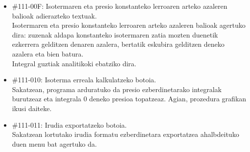 \documentclass[10pt,a4paper]{article}
\let\nf\normalfont %
\newcommand{\cf}{\normalfont\sffamily}
\begin{document}
\begin{itemize}
\item \cf \#111-00F: Isotermaren eta presio konstanteko lerroaren arteko azaleren balioak adierazteko textuak.
\\
\nf Isotermaren eta presio konstanteko lerroaren arteko azaleren balioak agertuko dira: zuzenak aldapa konstanteko isotermaren zatia mozten duenetik ezkerrera gelditzen denaren azalera, bertatik eskubira gelditzen deneko azalera eta bien batura.
\\

Integral guztiak analitikoki ebatziko dira.
\\

\item \cf \#111-010: Isoterma erreala kalkulatzeko botoia.
\\
\nf Sakatzean, programa arduratuko da presio ezberdinetarako integralak burutzeaz eta integrala 0 deneko presioa topatzeaz. Agian, prozedura grafikan ikusi daiteke.

\item \cf \#111-011: Irudia exportatzeko botoia.
\\
\nf Sakatzean lortutako irudia formatu ezberdinetara exportatzea ahalbdeituko duen menu bat agertuko da.
\end{itemize}
\end{document}
